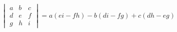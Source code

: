 \documentclass{article}
\begin{document}
\[
  \begin{vmatrix}
    a & b & c \\
    d & e & f \\
    g & h & i
  \end{vmatrix}
  = a(ei - fh) - b(di - fg) + c(dh - eg)
\]
\end{document}
